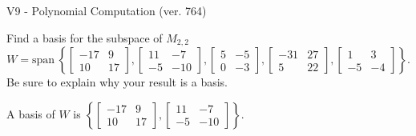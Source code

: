 \begin{exercise}
  \begin{exerciseTitle}V9 - Polynomial Computation (ver. 764)\end{exerciseTitle}
  \begin{exerciseStatement}
    Find a basis for the subspace of \(M_{2,2}\) 
\[W=\mathrm{span}\ \left\{\left[\begin{array}{cc}
-17 & 9 \\
10 & 17
\end{array}\right] , \left[\begin{array}{cc}
11 & -7 \\
-5 & -10
\end{array}\right] , \left[\begin{array}{cc}
5 & -5 \\
0 & -3
\end{array}\right] , \left[\begin{array}{cc}
-31 & 27 \\
5 & 22
\end{array}\right] , \left[\begin{array}{cc}
1 & 3 \\
-5 & -4
\end{array}\right]\right\}.\]
 Be sure to explain why your result is a basis.


  \end{exerciseStatement}
  \begin{exerciseAnswer}
   A basis of \(W\) is  \(\left\{\left[\begin{array}{cc}
-17 & 9 \\
10 & 17
\end{array}\right] , \left[\begin{array}{cc}
11 & -7 \\
-5 & -10
\end{array}\right]\right\}\).
  


  \end{exerciseAnswer}
\end{exercise}